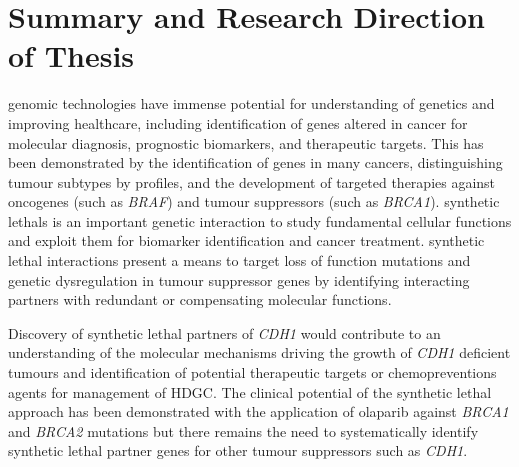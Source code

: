 
\section{Summary and Research Direction of Thesis}

\Gls{genomic} technologies have immense potential for understanding of genetics and improving healthcare, including identification of genes altered in cancer for molecular diagnosis, prognostic biomarkers, and therapeutic targets. This has been demonstrated by the identification of  genes in many cancers, distinguishing tumour subtypes by  profiles, and the development of targeted therapies against \glspl{oncogene} (such as \textit{BRAF}) and \glspl{tumour suppressor} (such as \textit{BRCA1}). \Glspl{synthetic lethal} is an important genetic interaction to study fundamental cellular functions and exploit them for biomarker identification and cancer treatment. \Gls{synthetic lethal} interactions present a means to target loss of function \glspl{mutation} and genetic dysregulation in \gls{tumour suppressor} genes by identifying interacting partners with redundant or compensating molecular functions.  

Discovery of \gls{synthetic lethal} partners of \textit{CDH1} would contribute to an understanding of the molecular mechanisms driving the growth of \textit{CDH1} deficient \glspl{tumour} and identification of potential therapeutic targets or \glspl{chemoprevention} agents for management of \gls{HDGC}. The clinical potential of the \gls{synthetic lethal} approach has been demonstrated with the application of olaparib against \textit{BRCA1} and \textit{BRCA2} \glspl{mutation} \citep{Lord2014} but there remains the need to systematically identify \gls{synthetic lethal} partner genes for other \glspl{tumour suppressor} such as \textit{CDH1}. 

